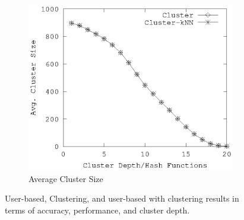 \documentclass[conference]{IEEEtran}
\begin{document}
\begin{figure}[!h]
\begin{subfigure}[b]{0.225\textwidth}
        \end{subfigure} 
        \\
         \begin{subfigure}[b]{0.225\textwidth}
                \includegraphics[width=\textwidth]{charts/cl-size.eps}
                \caption{Average Cluster Size}
                \label{fig:lsh-functions-candidate-size}
        \end{subfigure} 
        \caption{User-based, Clustering, and user-based with clustering results in terms of accuracy, performance, and cluster depth.}
        \label{fig:custering}
\end{figure}
\end{document}
